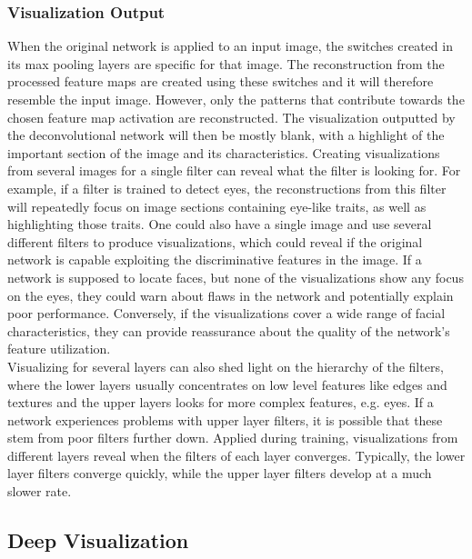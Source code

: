 \subsubsection{Visualization Output}

When the original network is applied to an input image, the switches created in its max pooling layers are specific for that image. The reconstruction from the processed feature maps are created using these switches and it will therefore resemble the input image. However, only the patterns that contribute towards the chosen feature map activation are reconstructed. The visualization outputted by the deconvolutional network will then be mostly blank, with a highlight of the important section of the image and its characteristics. Creating visualizations from several images for a single filter can reveal what the filter is looking for. For example, if a filter is trained to detect eyes, the reconstructions from this filter will repeatedly focus on image sections containing eye-like traits, as well as highlighting those traits. One could also have a single image and use several different filters to produce visualizations, which could reveal if the original network is capable exploiting the discriminative features in the image. If a network is supposed to locate faces, but none of the visualizations show any focus on the eyes, they could warn about flaws in the network and potentially explain poor performance. Conversely, if the visualizations cover a wide range of facial characteristics, they can provide reassurance about the quality of the network's feature utilization. \\

\noindent Visualizing for several layers can also shed light on the hierarchy of the filters, where the lower layers usually concentrates on low level features like edges and textures and the upper layers looks for more complex features, e.g. eyes. If a network experiences problems with upper layer filters, it is possible that these stem from poor filters further down. Applied during training, visualizations from different layers reveal when the filters of each layer converges. Typically, the lower layer filters converge quickly, while the upper layer filters develop at a much slower rate.


\subsection{Deep Visualization} \label{deep-vis}

